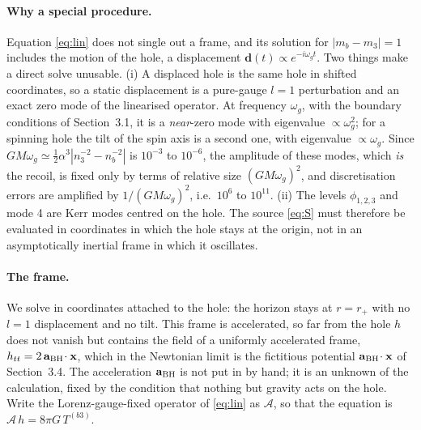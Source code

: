 \documentclass[11pt]{article}
\newcommand{\bx}{\mathbf{x}}\newcommand{\by}{\mathbf{y}}
\begin{document}
\paragraph{Why a special procedure.} Equation \eqref{eq:lin} does not single out a frame, and its solution for $|m_b-m_3|=1$ includes
the motion of the hole, a displacement $\mathbf d(t)\propto e^{-i\omega_gt}$. Two things make a direct solve unusable.
(i) A displaced hole is the same hole in shifted coordinates, so a static displacement is a pure-gauge $l=1$ perturbation
and an exact zero mode of the linearised operator. At frequency $\omega_g$, with the boundary conditions of Section~3.1, it is a
\emph{near}-zero mode with eigenvalue $\propto\omega_g^2$; for a spinning hole the tilt of the spin axis is a second one, with
eigenvalue $\propto\omega_g$. Since $GM\omega_g\simeq\tfrac12\alpha^3|n_3^{-2}-n_b^{-2}|$ is $10^{-3}$ to $10^{-6}$, the amplitude of these modes, which
\emph{is} the recoil, is fixed only by terms of relative size $(GM\omega_g)^2$, and discretisation errors are amplified by $1/(GM\omega_g)^2$, i.e.\ $10^{6}$ to $10^{11}$.
(ii) The levels $\phi_{1,2,3}$ and mode 4 are Kerr modes centred on the hole. The source \eqref{eq:S} must therefore be evaluated in
coordinates in which the hole stays at the origin, not in an asymptotically inertial frame in which it oscillates.

\paragraph{The frame.} We solve in coordinates attached to the hole: the horizon stays at $r=r_+$ with no $l=1$ displacement and no
tilt. This frame is accelerated, so far from the hole $h$ does not vanish but contains the field of a uniformly accelerated frame,
$h_{tt}=2\,\mathbf a_{\rm BH}\!\cdot\bx$, which in the Newtonian limit is the fictitious potential $\mathbf a_{\rm BH}\!\cdot\bx$ of Section~3.4.
The acceleration $\mathbf a_{\rm BH}$ is not put in by hand; it is an unknown of the calculation, fixed by the condition that nothing but
gravity acts on the hole. Write the Lorenz-gauge-fixed operator of \eqref{eq:lin} as $\mathcal A$, so that the equation is $\mathcal A\,h=8\pi G\,T^{(b3)}$.
\end{document}
